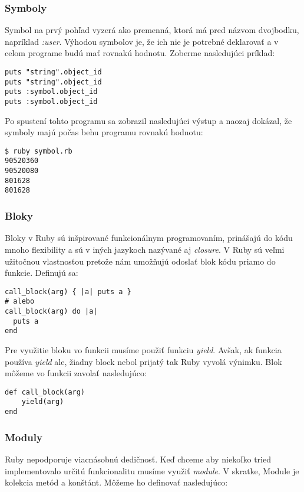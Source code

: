 \subsubsection{Symboly}

Symbol na prvý pohľad vyzerá ako premenná, ktorá má pred názvom dvojbodku, napríklad \emph{:user}. Výhodou symbolov je, že ich nie je potrebné deklarovať a v celom programe budú mať rovnakú hodnotu. Zoberme nasledujúci príklad:

\begin{verbatim}
puts "string".object_id
puts "string".object_id
puts :symbol.object_id
puts :symbol.object_id
\end{verbatim}

Po spustení tohto programu sa zobrazil nasledujúci výstup a naozaj dokázal, že symboly majú počas behu programu rovnakú hodnotu:

\begin{verbatim}
$ ruby symbol.rb
90520360
90520080
801628
801628
\end{verbatim}

\subsubsection{Bloky}

Bloky v Ruby sú inšpirované funkcionálnym programovaním, prinášajú do kódu mnoho flexibility a sú v iných jazykoch nazývané aj \emph{closure}. V Ruby sú veľmi užitočnou vlastnosťou pretože nám umožňujú odoslať blok kódu priamo do funkcie. Definujú sa:

\begin{verbatim}
call_block(arg) { |a| puts a }
# alebo
call_block(arg) do |a|
  puts a
end
\end{verbatim}

Pre využitie bloku vo funkcii musíme použiť funkciu \emph{yield}. Avšak, ak funkcia používa \emph{yield} ale, žiadny block nebol prijatý tak Ruby vyvolá výnimku. Blok môžeme vo funkcii zavolať nasledujúco:

\begin{verbatim}
def call_block(arg)
    yield(arg)
end
\end{verbatim}

\subsubsection{Moduly}

Ruby nepodporuje viacnásobnú dedičnosť. Keď chceme aby niekoľko tried implementovalo určitú funkcionalitu musíme využiť \emph{module}. V skratke, Module je kolekcia metód a konštánt. Môžeme ho definovať nasledujúco:

